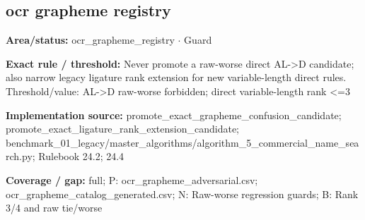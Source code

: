 \subsection*{ocr grapheme registry}
\begin{tcolorbox}[enhanced,breakable,colback=white,colframe=Muted!45,boxrule=0.45pt,arc=1.5pt,left=6pt,right=6pt,top=5pt,bottom=5pt,title={\texttt{OCR-AL-TO-D-RAW-GUARD-19}},title after break={\texttt{OCR-AL-TO-D-RAW-GUARD-19}\ (continued)},fonttitle=\headingfont\bfseries\color{Navy},coltitle=Navy]
\textbf{Area/status:} ocr\_\allowbreak{}grapheme\_\allowbreak{}registry $\boldsymbol{\cdot}$ Guard\par
\smallskip
\textbf{Exact rule / threshold:} Never promote a raw-worse direct AL->D candidate; also narrow legacy ligature rank extension for new variable-length direct rules. Threshold/\allowbreak{}value: AL->D raw-worse forbidden; direct variable-length rank <=3\par
\smallskip
\textbf{Implementation source:} promote\_\allowbreak{}exact\_\allowbreak{}grapheme\_\allowbreak{}confusion\_\allowbreak{}candidate; promote\_\allowbreak{}exact\_\allowbreak{}ligature\_\allowbreak{}rank\_\allowbreak{}extension\_\allowbreak{}candidate; benchmark\_\allowbreak{}01\_\allowbreak{}legacy/\allowbreak{}master\_\allowbreak{}algorithms/\allowbreak{}algorithm\_\allowbreak{}5\_\allowbreak{}commercial\_\allowbreak{}name\_\allowbreak{}search.py; Rulebook 24.2; 24.4\par
\smallskip
\textbf{Coverage / gap:} full; P: ocr\_\allowbreak{}grapheme\_\allowbreak{}adversarial.csv; ocr\_\allowbreak{}grapheme\_\allowbreak{}catalog\_\allowbreak{}generated.csv; N: Raw-worse regression guards; B: Rank 3/\allowbreak{}4 and raw tie/\allowbreak{}worse
\end{tcolorbox}
